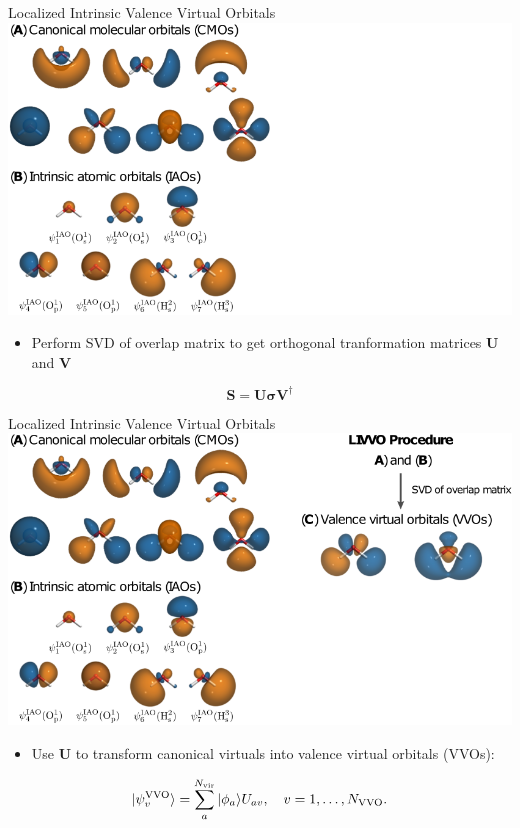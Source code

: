 \documentclass[t]{beamer}
\begin{document}
\begin{frame}{Localized Intrinsic Valence Virtual Orbitals}
\centering
\includegraphics[width=0.75\linewidth]{livvo_procedure_2.png}
\begin{itemize}
\item Perform SVD of overlap matrix to get orthogonal tranformation matrices $\mathbf{U}$ and $\mathbf{V}$
\end{itemize}
\begin{equation}
\mathbf{S} = \mathbf{U} \boldsymbol{
\sigma} \mathbf{V}^{\dagger}
\end{equation}
\end{frame}


\begin{frame}{Localized Intrinsic Valence Virtual Orbitals}
\centering
\includegraphics[width=0.75\linewidth]{livvo_procedure_3.png}
\begin{itemize}
\item Use $\mathbf{U}$ to transform canonical virtuals into valence virtual orbitals (VVOs):
\end{itemize}
\begin{equation}
| \psi^{\rm VVO}_v \rangle = \sum_a^{N_\mathrm{vir}} | \phi_a \rangle U_{av}, \quad v = 1, \ldots, N_{\rm VVO}.
\end{equation}
\end{frame}
\end{document}
